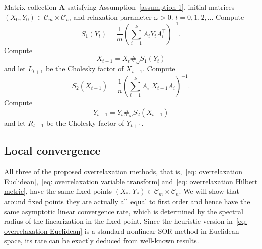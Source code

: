 \documentclass[a4paper]{article}
\newcommand{\bA}{\mathbf{A}}
\newcommand{\caC}{\mathcal{C}}
\theoremstyle{definition}
\numberwithin{equation}{section}
\begin{document}
\begin{algorithm}[t]
\small
\caption{Fixed-point Iteration on PD Cones with Geodesic Overrelaxation (Geodesic-OR)}
\label{algo: overrelaxation geodesic}
\begin{algorithmic}[1]
\Input
Matrix collection $\bA$ satisfying Assumption~\ref{assumption 1},  initial matrices $(X_0, Y_0) \in \caC_m \times \caC_n$, and relaxation parameter $\omega >0$.
\For
{$t = 0,1,2,\dots$}
    \State
    Compute
    \[
    S_1(Y_t) = \frac{1}{m} \left(\sum_{i=1}^k A_i Y_t A_i^\top \right)^{-1}.  %
    \]
    \State
    Compute
    \[
    X_{t+1} = X_t \#_\omega S_1(Y_t)
    \]
    and let $L_{t+1}$ be the Cholesky factor of $X_{t+1}$.
    \State
    Compute
    \[
    S_2(X_{t+1}) = \frac{1}{n} \left(\sum_{i=1}^k A_i^\top X_{t+1} A_i \right)^{-1}. %
    \]
    \State
    Compute
    \[
    Y_{t+1} = Y_t \#_\omega S_2(X_{t+1})
    \]
    and let $R_{t+1}$ be the Cholesky factor of $Y_{t+1}$.
\EndFor
\end{algorithmic}
\end{algorithm}

\subsection{Local convergence}\label{sec: local convergence}

All three of the proposed overrelaxation methods, that is,~\eqref{eq: overrelaxation Euclidean},~\eqref{eq: overrelaxation variable transform} and~\eqref{eq: overrelaxation Hilbert metric}, have the same fixed points $(X_*,Y_*) \in \caC_{m} \times \caC_n$. We will show that around fixed points they are actually all equal to first order and hence have the same asymptotic linear convergence rate, which is determined by the spectral radius of the linearization in the fixed point. Since the heuristic version in~\eqref{eq: overrelaxation Euclidean} is a standard nonlinear SOR method in Euclidean space, its rate can be exactly deduced from well-known results.
\end{document}
